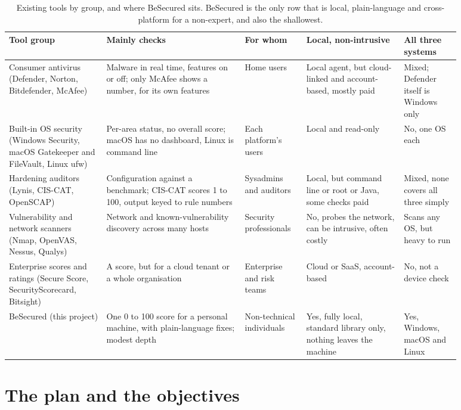 \documentclass[11pt,a4paper]{article}
\begin{document}
\begin{table}[h]
\centering\footnotesize
\setlength{\tabcolsep}{4pt}
\begin{tabular}{@{}p{0.19\linewidth}p{0.27\linewidth}p{0.12\linewidth}p{0.19\linewidth}p{0.11\linewidth}@{}}
\toprule
Tool group & Mainly checks & For whom & Local, non-intrusive & All three systems \\
\midrule
Consumer antivirus (Defender, Norton, Bitdefender, McAfee) & Malware in real time, features on or off; only McAfee shows a number, for its own features & Home users & Local agent, but cloud-linked and account-based, mostly paid & Mixed; Defender itself is Windows only \\
Built-in OS security (Windows Security, macOS Gatekeeper and FileVault, Linux ufw) & Per-area status, no overall score; macOS has no dashboard, Linux is command line & Each platform's users & Local and read-only & No, one OS each \\
Hardening auditors (Lynis, CIS-CAT, OpenSCAP) & Configuration against a benchmark; CIS-CAT scores 1 to 100, output keyed to rule numbers & Sysadmins and auditors & Local, but command line or root or Java, some checks paid & Mixed, none covers all three simply \\
Vulnerability and network scanners (Nmap, OpenVAS, Nessus, Qualys) & Network and known-vulnerability discovery across many hosts & Security professionals & No, probes the network, can be intrusive, often costly & Scans any OS, but heavy to run \\
Enterprise scores and ratings (Secure Score, SecurityScorecard, Bitsight) & A score, but for a cloud tenant or a whole organisation & Enterprise and risk teams & Cloud or SaaS, account-based & No, not a device check \\
\midrule
BeSecured (this project) & One 0 to 100 score for a personal machine, with plain-language fixes; modest depth & Non-technical individuals & Yes, fully local, standard library only, nothing leaves the machine & Yes, Windows, macOS and Linux \\
\bottomrule
\end{tabular}
\caption{Existing tools by group, and where BeSecured sits. BeSecured is the only
row that is local, plain-language and cross-platform for a non-expert, and also
the shallowest.}
\end{table}

\section{The plan and the objectives}
\end{document}
